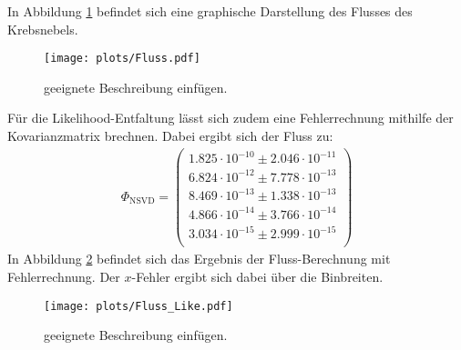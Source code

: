 In Abbildung \ref{fig:Fluss} befindet sich eine graphische Darstellung des Flusses des Krebsnebels.\\
\begin{figure}
  \centering
  \texttt{[image: plots/Fluss.pdf]}
  \caption{geeignete Beschreibung einfügen.}
  \label{fig:Fluss}
\end{figure}
Für die Likelihood-Entfaltung lässt sich zudem eine Fehlerrechnung mithilfe der Kovarianzmatrix brechnen. Dabei ergibt sich der Fluss zu:
\begin{align*}
	\Phi_{\text{NSVD}} = \begin{pmatrix}
			1.825\cdot10^{-10}\pm 2.046\cdot10^{-11}\\
			6.824\cdot10^{-12}\pm 7.778\cdot10^{-13}\\
			8.469\cdot10^{-13}\pm 1.338\cdot10^{-13}\\
			4.866\cdot10^{-14}\pm 3.766\cdot10^{-14}\\
			3.034\cdot10^{-15}\pm 2.999\cdot10^{-15}\\
	 \end{pmatrix}
\end{align*}
In Abbildung \ref{fig:FlussLike} befindet sich das Ergebnis der Fluss-Berechnung mit Fehlerrechnung. Der $x$-Fehler ergibt sich dabei über die Binbreiten.
\begin{figure}
  \centering
  \texttt{[image: plots/Fluss\_Like.pdf]}
  \caption{geeignete Beschreibung einfügen.}
  \label{fig:FlussLike}
\end{figure}
